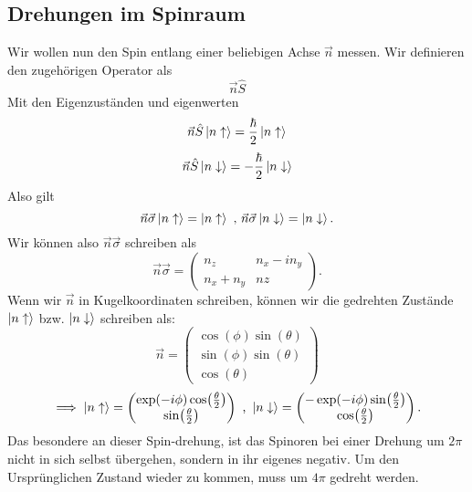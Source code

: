 \documentclass{report}
\begin{document}
\subsection{Drehungen im Spinraum}
Wir wollen nun den Spin entlang einer beliebigen Achse $\vec{n}$ messen. Wir definieren den zugehörigen Operator als \[
	\vec{n} \hat{S}
\] Mit den Eigenzuständen und eigenwerten \[
\vec{n} \hat{S} \ket{n \uparrow} = \frac{\hbar}{2} \ket{n \uparrow} 
\] \[
\vec{n} \hat{S} \ket{n \downarrow} = -\frac{\hbar}{2} \ket{n \downarrow} 
\] Also gilt \[
\vec{n}\vec{\sigma} \ket{n \uparrow} = \ket{n \uparrow} \text{ , } \vec{n} \vec{\sigma} \ket{n \downarrow} = \ket{n \downarrow}   
.\] Wir können also $\vec{n} \vec{\sigma}$ schreiben als \[
\vec{n} \vec{\sigma} = \begin{pmatrix} n_z & n_x - i n_y \\ n_x + n_y & nz \end{pmatrix} 
.\]  Wenn wir $\vec{n}$ in Kugelkoordinaten schreiben, können wir die gedrehten Zustände $\ket{n \uparrow} $ bzw. $\ket{n \downarrow} $ schreiben als: \[
\vec{n} = \begin{pmatrix} \cos(\phi) \sin(\theta) \\ \sin(\phi) \sin(\theta) \\ \cos(\theta) \end{pmatrix} 
\] \[
\implies \ket{n \uparrow} = \begin{pmatrix} \exp(-i \phi) \cos(\frac{\theta}{2}) \\ \sin(\frac{\theta}{2}) \end{pmatrix} \text{ , } \ket{n \downarrow} = \begin{pmatrix} -\exp(-i \phi) \sin(\frac{\theta}{2}) \\ \cos(\frac{\theta}{2}) \end{pmatrix}  
.\] Das besondere an dieser Spin-drehung, ist das Spinoren bei einer Drehung um $2\pi$ nicht in sich selbst übergehen, sondern in ihr eigenes negativ. Um den Ursprünglichen Zustand wieder zu kommen, muss um $4\pi$ gedreht werden.
\end{document}
